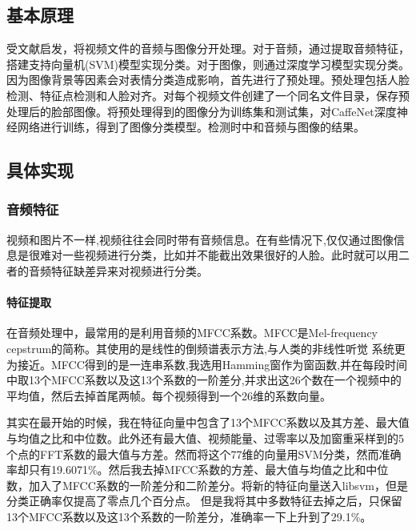 \documentclass{article}
\begin{document}
\begin{multicols}{2}
        \subsection{基本原理}
            受文献\cite{Fan2016}启发，将视频文件的音频与图像分开处理。对于音频，通过提取音频特征，搭建支持向量机(SVM)模型实现分类。对于图像，则通过深度学习模型实现分类。因为图像背景等因素会对表情分类造成影响，首先进行了预处理。预处理包括人脸检测、特征点检测和人脸对齐。对每个视频文件创建了一个同名文件目录，保存预处理后的脸部图像。将预处理得到的图像分为训练集和测试集，对CaffeNet深度神经网络进行训练，得到了图像分类模型。检测时中和音频与图像的结果。
        \subsection{具体实现}
            \subsubsection{音频特征}
                视频和图片不一样,视频往往会同时带有音频信息。在有些情况下,仅仅通过图像信息是很难对一些视频进行分类，比如并不能截出效果很好的人脸。此时就可以用二者的音频特征缺差异来对视频进行分类。
                \paragraph{特征提取}
                    在音频处理中，最常用的是利用音频的MFCC系数。MFCC是Mel-frequency cepstrum的简称。其使用的是线性的倒频谱表示方法,与人类的非线性听觉 系统更为接近。MFCC得到的是一连串系数,我选用Hamming窗作为窗函数,并在每段时间中取13个MFCC系数以及这13个系数的一阶差分,并求出这26个数在一个视频中的平均值，然后去掉首尾两帧。每个视频得到一个26维的系数向量。

                    其实在最开始的时候，我在特征向量中包含了13个MFCC系数以及其方差、最大值与均值之比和中位数。此外还有最大值、视频能量、过零率以及加窗重采样到的5个点的FFT系数的最大值与方差。然而将这个77维的向量用SVM分类，然而准确率却只有19.6071\%。然后我去掉MFCC系数的方差、最大值与均值之比和中位数，加入了MFCC系数的一阶差分和二阶差分。将新的特征向量送入libsvm，但是分类正确率仅提高了零点几个百分点。
                    但是我将其中多数特征去掉之后，只保留13个MFCC系数以及这13个系数的一阶差分，准确率一下上升到了29.1\%。

\end{multicols}
\end{document}
